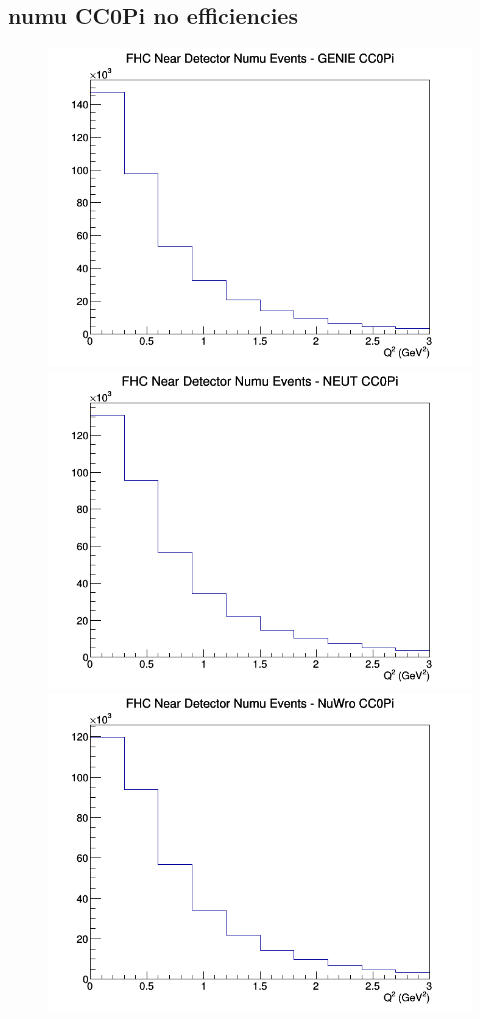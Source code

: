 \subsection{numu CC0Pi no efficiencies}
\begin{figure}[h]
\includegraphics[width=\linewidth]{Q2/nominal/CC0Pi_FHC_ND_numu_Q2_GENIE.png}
\endminipage
{}
\includegraphics[width=\linewidth]{Q2/nominal/CC0Pi_FHC_ND_numu_Q2_NEUT.png}
\endminipage
{}
\includegraphics[width=\linewidth]{Q2/nominal/CC0Pi_FHC_ND_numu_Q2_NuWro.png}

\end{figure}
